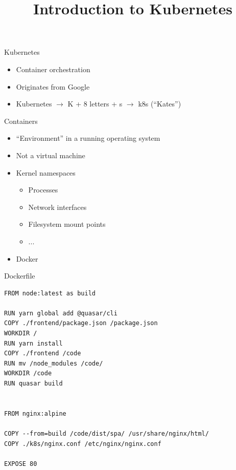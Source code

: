 \documentclass{dcpresentation}
\title{Introduction to Kubernetes}
\author{}
\institute{SciLifeLab Data Centre}
\date{}
\begin{document}
 \begin{frame}
  \maketitle
 \end{frame}

 
  \begin{frame}{Kubernetes}
  \begin{itemize}
   \item Container orchestration
   \item Originates from Google
   \item Kubernetes $\rightarrow$ K + 8 letters + s $\rightarrow$ k8s (``Kates'')
  \end{itemize}
 \end{frame}
 
 \begin{frame}{Containers}
  \begin{itemize}
   \item ``Environment'' in a running operating system
   \item Not a virtual machine
   \item Kernel namespaces
   \begin{itemize}
    \item Processes
    \item Network interfaces
    \item Filesystem mount points
    \item ...
   \end{itemize}
   \item Docker
  \end{itemize}
 \end{frame}
 
 \begin{frame}[fragile]{Dockerfile}
 \scriptsize
  \begin{verbatim}
FROM node:latest as build

RUN yarn global add @quasar/cli
COPY ./frontend/package.json /package.json
WORKDIR /
RUN yarn install
COPY ./frontend /code
RUN mv /node_modules /code/
WORKDIR /code
RUN quasar build


FROM nginx:alpine

COPY --from=build /code/dist/spa/ /usr/share/nginx/html/
COPY ./k8s/nginx.conf /etc/nginx/nginx.conf

EXPOSE 80
  \end{verbatim}
 \end{frame}
\end{document}
